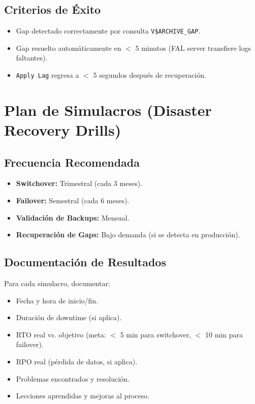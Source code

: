 \documentclass[11pt, a4paper]{report}
\begin{document}
\subsection{Criterios de Éxito}
\begin{itemize}
    \item Gap detectado correctamente por consulta \texttt{V\$ARCHIVE\_GAP}.
    \item Gap resuelto automáticamente en $<$ 5 minutos (FAL server transfiere logs faltantes).
    \item \texttt{Apply Lag} regresa a $<$ 5 segundos después de recuperación.
\end{itemize}

\section{Plan de Simulacros (Disaster Recovery Drills)}

\subsection{Frecuencia Recomendada}
\begin{itemize}
    \item \textbf{Switchover:} Trimestral (cada 3 meses).
    \item \textbf{Failover:} Semestral (cada 6 meses).
    \item \textbf{Validación de Backups:} Mensual.
    \item \textbf{Recuperación de Gaps:} Bajo demanda (si se detecta en producción).
\end{itemize}

\subsection{Documentación de Resultados}
Para cada simulacro, documentar:
\begin{itemize}
    \item Fecha y hora de inicio/fin.
    \item Duración de downtime (si aplica).
    \item RTO real vs. objetivo (meta: $<$ 5 min para switchover, $<$ 10 min para failover).
    \item RPO real (pérdida de datos, si aplica).
    \item Problemas encontrados y resolución.
    \item Lecciones aprendidas y mejoras al proceso.
\end{itemize}
\end{document}
